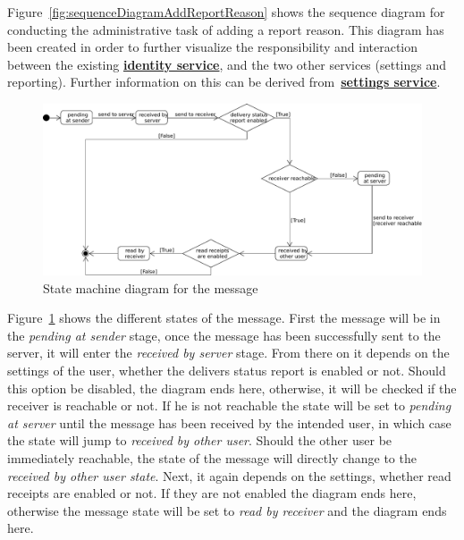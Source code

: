Figure~\ref{fig:sequenceDiagramAddReportReason} shows the sequence diagram for conducting the administrative task of
adding a report reason.
This diagram has been created in order to further visualize the responsibility and interaction between the existing
\hyperref[subsubsec:identitySer]{\textbf{identity service}}, and the two other services (settings and reporting).
Further information on this can be derived from~\hyperref[subsubsec:settingsSer]{\textbf{settings service}}.

\begin{figure}[H]
    \centering
    \includegraphics[width=1.0\textwidth]{./graphics/stateMachineMessage}
    \caption{State machine diagram for the message}
    \label{fig:stateMachineMessage}
\end{figure}

Figure~\ref{fig:stateMachineMessage} shows the different states of the message.
First the message will be in the \textit{pending at sender} stage, once the message has been successfully sent to the
server, it will enter the \textit{received by server} stage.
From there on it depends on the settings of the user, whether the delivers status report is enabled or not.
Should this option be disabled, the diagram ends here, otherwise, it will be checked if the receiver is reachable or
not.
If he is not reachable the state will be set to \textit{pending at server} until the message has been received by the
intended user, in which case the state will jump to \textit{received by other user}.
Should the other user be immediately reachable, the state of the message will directly change to the
\textit{received by other user state}.
Next, it again depends on the settings, whether read receipts are enabled or not.
If they are not enabled the diagram ends here, otherwise the message state will be set to \textit{read by receiver}
and the diagram ends here.

